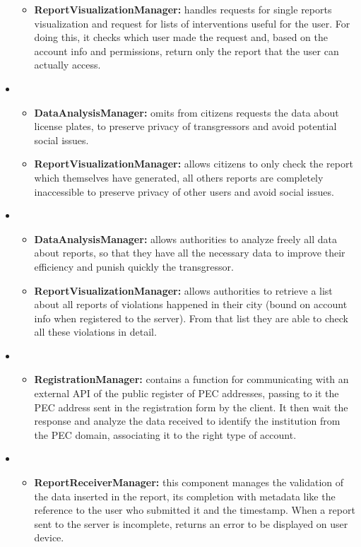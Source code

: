 \begin{itemize}[label={}]
\begin{itemize}
		\item \textbf{ReportVisualizationManager:} handles requests for single reports visualization and request for lists of interventions useful for the user. For doing this, it checks which user made the request and, based on the account info and permissions, return only the report that the user can actually access. 
	\end{itemize}
	\item {}
	\begin{itemize}
		\item \textbf{DataAnalysisManager:} omits from citizens requests the data about license plates, to preserve privacy of transgressors and avoid potential social issues. 
		\item \textbf{ReportVisualizationManager:} allows citizens to only check the report which themselves have generated, all others reports are completely inaccessible to preserve privacy of other users and avoid social issues. 
	\end{itemize}
	\item {}
	\begin{itemize}
		\item \textbf{DataAnalysisManager:} allows authorities to analyze freely all data about reports, so that they have all the necessary data to improve their efficiency and punish quickly the transgressor.
		\item \textbf{ReportVisualizationManager:} allows authorities to retrieve a list about all reports of violations happened in their city (bound on account info when registered to the server). From that list they are able to check all these violations in detail. 
	\end{itemize}
	\item {}
	\begin{itemize}
		\item \textbf{RegistrationManager:} contains a function for communicating with an external API of the public register of PEC addresses, passing to it the PEC address sent in the registration form by the client. It then wait the response and analyze the data received to identify the institution from the PEC domain, associating it to the right type of account.
	\end{itemize}
	\item {}
	\begin{itemize}
		\item \textbf{ReportReceiverManager:} this component manages the validation of the data inserted in the report, its completion with metadata like the reference to the user who submitted it and the timestamp. When a report sent to the server is incomplete, returns an error to be displayed on user device.

\end{itemize}
\end{itemize}
